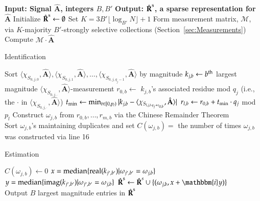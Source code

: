 \documentclass{article}
\begin{document}
\begin{algorithm}[tb]
\begin{algorithmic}[1]
\caption{$\proc{Sparse Approximate}$} \label{alg:reconstruct}
\STATE \textbf{Input: Signal $\hat{\textbf{A}}$, integers $B, B'$} 
\STATE \textbf{Output: $\hat{\textbf{R}}^{\rm s}$, a sparse representation for $\hat{\textbf{A}}$}
\STATE Initialize $\hat{\textbf{R}}^{\rm s} \leftarrow \emptyset$
\STATE Set $K = 3 B'\lfloor \log_{B'} N \rfloor + 1$
\STATE Form measurement matrix, $\mathcal{M}$, via $K$-majority $B'$-strongly selective collections (Section~\ref{sec:Measurements})
\STATE Compute $\mathcal{M} \cdot \hat{\textbf{A}}$ \\
\begin{center}
{\sc Identification}
\end{center}
	\STATE Sort $\langle \chi_{S_{0,j,0}},\hat{\textbf{A}} \rangle, \langle \chi_{S_{0,j,1}},\hat{\textbf{A}} \rangle, \dots, \langle \chi_{S_{0,j,q_{j}-1}},\hat{\textbf{A}} \rangle$ by magnitude
		\STATE $k_{j,b} \leftarrow b^{\rm th}$ largest magnitude $\langle \chi_{S_{0,j,\cdot}},\hat{\textbf{A}} \rangle$-measurement
		\STATE $r_{0,b} \leftarrow$ $k_{j,b}$'s associated residue mod $q_{j}$ (i.e., the $\cdot$ in $\langle \chi_{S_{0,j,\cdot}},\hat{\textbf{A}} \rangle$)
			\STATE $t_{\rm min} \leftarrow \min_{t \in [0,p_{l})} |k_{j,b} - \langle \chi_{S_{l,j,t \cdot q_{j} + r_{0,b}}},\hat{\textbf{A}} \rangle|$
			\STATE $r_{l,b} \leftarrow r_{0,b} + t_{\rm min} \cdot q_{j}$ mod $p_{l}$
		\ENDFOR
		\STATE Construct $\omega_{j,b}$ from $r_{0,b}, \dots, r_{m,b}$ via the Chinese Remainder Theorem
	\ENDFOR
\ENDFOR \\
\STATE Sort $\omega_{j,b}$'s maintaining duplicates and set $C(\omega_{j,b}) =$ the number of times $\omega_{j,b}$ was constructed via line 16
\begin{center}
{\sc Estimation}
\end{center}
			\STATE $C(\omega_{j,b}) \leftarrow 0$ 
			\STATE $x = {\rm median} \{ {\rm real}(k_{j',b'}) | \omega_{j',b'} = \omega_{j,b} \}$
			\STATE $y = {\rm median} \{ {\rm imag}(k_{j',b'}) | \omega_{j',b'} = \omega_{j,b} \}$
			\STATE $\hat{\textbf{R}}^{\rm s} \leftarrow \hat{\textbf{R}}^{s} \cup \{ (\omega_{j,b}, x+ \mathbbm{i} y) \}$
		\ENDIF
	\ENDFOR
\ENDFOR \\
\STATE Output $B$ largest magnitude entries in $\hat{\textbf{R}}^{\rm s}$
\end{algorithmic}
\end{algorithm}
\end{document}
